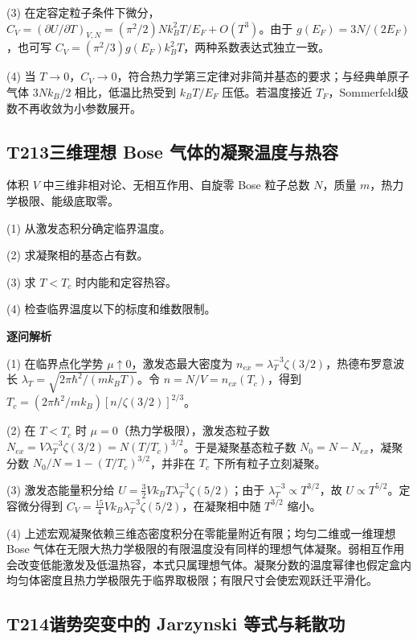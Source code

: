 (3) 在定容定粒子条件下微分，$C_V=(\partial U/\partial T)_{V,N}=(\pi^2/2)Nk_B^2T/E_F+O(T^3)$。由于 $g(E_F)=3N/(2E_F)$，也可写 $C_V=(\pi^2/3)g(E_F)k_B^2T$，两种系数表达式独立一致。

(4) 当 $T\to0$，$C_V\to0$，符合热力学第三定律对非简并基态的要求；与经典单原子气体 $3Nk_B/2$ 相比，低温比热受到 $k_BT/E_F$ 压低。若温度接近 $T_F$，Sommerfeld级数不再收敛为小参数展开。

\par\medskip

\subsection*{T213\quad 三维理想 Bose 气体的凝聚温度与热容}

体积 $V$ 中三维非相对论、无相互作用、自旋零 Bose 粒子总数 $N$，质量 $m$，热力学极限、能级底取零。

(1) 从激发态积分确定临界温度。

(2) 求凝聚相的基态占有数。

(3) 求 $T<T_c$ 时内能和定容热容。

(4) 检查临界温度以下的标度和维数限制。

\par\textbf{逐问解析}

(1) 在临界点化学势 $\mu\uparrow0$，激发态最大密度为 $n_{ex}=\lambda_T^{-3}\zeta(3/2)$，热德布罗意波长 $\lambda_T=\sqrt{2\pi\hbar^2/(mk_BT)}$。令 $n=N/V=n_{ex}(T_c)$，得到 $T_c=(2\pi\hbar^2/mk_B)[n/\zeta(3/2)]^{2/3}$。

(2) 在 $T<T_c$ 时 $\mu=0$（热力学极限），激发态粒子数 $N_{ex}=V\lambda_T^{-3}\zeta(3/2)=N(T/T_c)^{3/2}$。于是凝聚基态粒子数 $N_0=N-N_{ex}$，凝聚分数 $N_0/N=1-(T/T_c)^{3/2}$，并非在 $T_c$ 下所有粒子立刻凝聚。

(3) 激发态能量积分给 $U=\frac32Vk_BT\lambda_T^{-3}\zeta(5/2)$；由于 $\lambda_T^{-3}\propto T^{3/2}$，故 $U\propto T^{5/2}$。定容微分得到 $C_V=\frac{15}{4}Vk_B\lambda_T^{-3}\zeta(5/2)$，在凝聚相中随 $T^{3/2}$ 缩小。

(4) 上述宏观凝聚依赖三维态密度积分在零能量附近有限；均匀二维或一维理想 Bose 气体在无限大热力学极限的有限温度没有同样的理想气体凝聚。弱相互作用会改变低能激发及低温热容，本式只属理想气体。凝聚分数的温度幂律也假定盒内均匀体密度且热力学极限先于临界取极限；有限尺寸会使宏观跃迁平滑化。

\par\medskip

\subsection*{T214\quad 谐势突变中的 Jarzynski 等式与耗散功}

